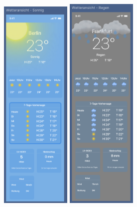 \documentclass{article}
\begin{document}
\begin{figure}[htp]
\centering
\includegraphics[width=0.3\textwidth]{wetter_sonnig.png}\hfill
\includegraphics[width=0.3\textwidth]{wetter_regen.png}\hfill

\end{figure}
\end{document}
